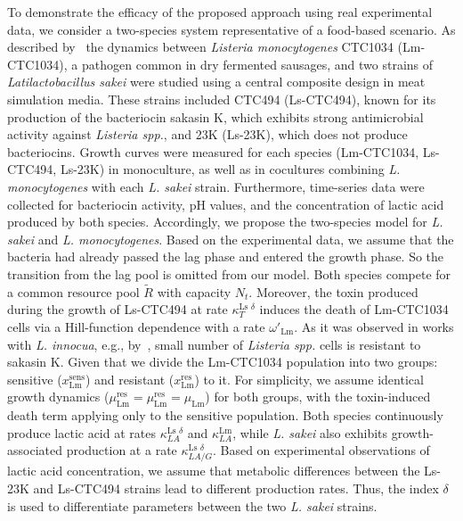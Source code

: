 \documentclass[10pt,1p,authoryear]{elsarticle}
\numberwithin{equation}{section}
\begin{document}
To demonstrate the efficacy of the proposed approach using real experimental data, we consider a two-species system representative of a food-based scenario.
As described by~\citet{ferrer-bustinsAntilisterialEffect2024} the dynamics between \textit{Listeria monocytogenes} CTC1034 (Lm-CTC1034), a pathogen common in dry fermented sausages, and two strains of  \textit{Latilactobacillus sakei} were studied using a central composite design in meat simulation media.
These strains included CTC494 (Ls-CTC494), known for its production of the bacteriocin sakasin K, which exhibits strong antimicrobial activity against \textit{Listeria spp.}, and 23K (Ls-23K), which does not produce bacteriocins.
Growth curves were measured for each species (Lm-CTC1034, Ls-CTC494, Ls-23K) in monoculture, as well as in cocultures combining \textit{L. monocytogenes} with each \textit{L. sakei} strain.
Furthermore, time-series data were collected for bacteriocin activity, pH values, and the concentration of lactic acid produced by both species.
Accordingly, we propose the two-species model for \textit{L. sakei} and \textit{L. monocytogenes}.
Based on the experimental data, we assume that the bacteria had already passed the lag phase and entered the growth phase.
So the transition from the lag pool is omitted from our model. 
Both species compete for a common resource pool $\tilde{R}$ with capacity $N_t$.
Moreover, the toxin produced during the growth of Ls-CTC494 at rate $\kappa_T^{\text{Ls } \delta}$ induces the death of Lm-CTC1034 cells via a Hill-function dependence with a rate $\omega'_\text{Lm}$.
As it was observed in works with \textit{L. innocua}, e.g., by~\citet{leroyModelingBacteriocin2005}, small number of \textit{Listeria spp.} cells is resistant to sakasin K.
Given that we divide the Lm-CTC1034 population into two groups: sensitive ($x^\text{sens}_\text{Lm}$) and resistant ($x^\text{res}_\text{Lm}$) to it.
For simplicity, we assume identical growth dynamics ($\mu^\text{res}_\text{Lm} = \mu^\text{res}_\text{Lm} = \mu_\text{Lm}$) for both groups, with the toxin-induced death term applying only to the sensitive population.
Both species continuously produce lactic acid at rates $\kappa_{LA}^{\text{Ls } \delta}$ and $\kappa_{LA}^\text{Lm}$,  while \textit{L. sakei} also exhibits growth-associated production at a rate $\kappa_{LA/G}^{\text{Ls } \delta}$.
Based on experimental observations of lactic acid concentration, we assume that metabolic differences between the Ls-23K and Ls-CTC494 strains lead to different production rates.
Thus, the index $\delta$ is used to differentiate parameters between the two \textit{L. sakei} strains. 
\end{document}
